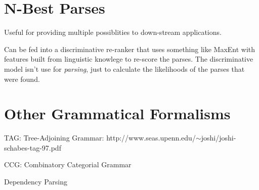 \documentclass[11pt,letterpaper]{article}
\begin{document}
\section{N-Best Parses}

Useful for providing multiple possiblities to down-stream applications.

Can be fed into a discriminative re-ranker that uses something like MaxEnt with features built from linguistic knowlege to re-score the parses.  The discriminative model isn't use for \textit{parsing}, just to calculate the likelihoods of the parses that were found.




\section{Other Grammatical Formalisms}

TAG: Tree-Adjoining Grammar: http://www.seas.upenn.edu/$\sim$joshi/joshi-schabes-tag-97.pdf

CCG: Combinatory Categorial Grammar

Dependency Parsing
\end{document}
